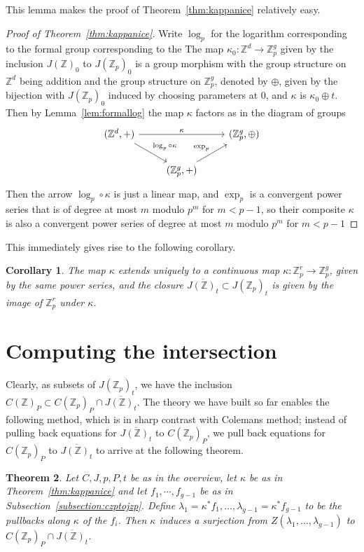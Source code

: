 \documentclass[12pt]{article}
\newcommand{\Z}{\mathbb{Z}}
\theoremstyle{plain}
\newtheorem{thm}{Theorem}[section] %
\newtheorem{cor}[thm]{Corollary} %
\theoremstyle{definition}
\theoremstyle{remark}
\begin{document}
This lemma makes the proof of Theorem~\ref{thm:kappanice} relatively easy. 
\begin{proof}[Proof of Theorem~\ref{thm:kappanice}]
Write $\log_p$ for the logarithm corresponding to the formal group corresponding to the The map $\kappa_0: \Z^d \to \Z_p^g$ given by the inclusion $J(\Z)_0$ to $J(\Z_p)_0$ is a group morphism with the group structure on $\Z^d$ being addition and the group structure on $\Z_p^g$, denoted by $\oplus$, given by the bijection with $J(\Z_p)_0$ induced by choosing parameters at $0$, and $\kappa$ is $\kappa_0 \oplus t$. Then by Lemma~\ref{lem:formallog} the map $\kappa$ factors as in the diagram of groups
\[
\begin{tikzcd}
{(\Z^d,+)} \arrow[rr, "\kappa"] \arrow[rd, "\log_p \circ \kappa"] &                                   & {(\Z_p^g,\oplus)} \\
                                                                  & {(\Z_p^g,+)} \arrow[ru, "\exp_p"] &                  
\end{tikzcd}
\]
Then the arrow $\log_p \circ \kappa$ is just a linear map, and $\exp_p$ is a convergent power series that is of degree at most $m$ modulo $p^m$ for $m < p-1$, so their composite $\kappa$ is also a convergent power series of degree at most $m$ modulo $p^m$ for $m < p-1$
\end{proof}

This immediately gives rise to the following corollary.
\begin{cor}
\label{cor:closurejac}
The map $\kappa$ extends uniquely to a continuous map $\kappa: \Z_p^r \to \Z_p^g$, given by the same power series, and the closure $\overline{J(\Z)_t} \subset J(\Z_p)_t$ is given by the image of $\Z_p^r$ under $\kappa$.
\end{cor}

\section{Computing the intersection}
\label{section:intersection}
Clearly, as subsets of $J(\Z_p)_t$, we have the inclusion $C(\Z)_P \subset C(\Z_p)_P \cap \overline{J(\Z)_t}$. The theory we have built so far enables the following method, which is in sharp contrast with Colemans method; instead of pulling back equations for $\overline{J(\Z)_t}$ to $C(\Z_p)_P$, we pull back equations for $C(\Z_p)_P$ to $\overline{J(\Z)_t}$ to arrive at the following theorem.
\begin{thm}
Let $C,J,p,P,t$ be as in the overview, let $\kappa$ be as in Theorem~\ref{thm:kappanice} and let $f_1,\cdots,f_{g-1}$ be as in Subsection~\ref{subsection:czptojzp}. Define $\lambda_1 = \kappa^*f_1,\dots,\lambda_{g-1} = \kappa^*f_{g-1}$ to be the pullbacks along $\kappa$ of the $f_i$. Then $\kappa$ induces a surjection from $Z(\lambda_1,\dots,\lambda_{g-1})$ to $C(\Z_p)_P \cap \overline{J(\Z)_t}$.
\end{thm}
\end{document}
